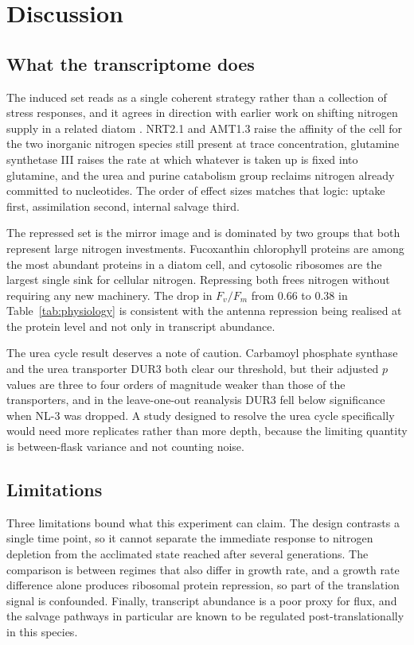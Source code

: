 \section{Discussion}
\label{sec:discussion}

\subsection{What the transcriptome does}

The induced set reads as a single coherent strategy rather than a collection of
stress responses, and it agrees in direction with earlier work on shifting
nitrogen supply in a related diatom \citep{alexander2015metabolic}. NRT2.1 and AMT1.3 raise the affinity of the cell for the two
inorganic nitrogen species still present at trace concentration, glutamine
synthetase III raises the rate at which whatever is taken up is fixed into
glutamine, and the urea and purine catabolism group reclaims nitrogen already
committed to nucleotides. The order of effect sizes matches that logic: uptake
first, assimilation second, internal salvage third.

The repressed set is the mirror image and is dominated by two groups that both
represent large nitrogen investments. Fucoxanthin chlorophyll proteins are
among the most abundant proteins in a diatom cell, and cytosolic ribosomes are
the largest single sink for cellular nitrogen. Repressing both frees nitrogen
without requiring any new machinery. The drop in
$F_v/F_m$ from 0.66 to 0.38 in Table~\ref{tab:physiology} is consistent with
the antenna repression being realised at the protein level and not only in
transcript abundance.

The urea cycle result deserves a note of caution. Carbamoyl phosphate synthase
and the urea transporter DUR3 both clear our threshold, but their adjusted
$p$ values are three to four orders of magnitude weaker than those of the
transporters, and in the leave-one-out reanalysis DUR3 fell below significance
when NL-3 was dropped. A study designed to resolve the urea cycle specifically
would need more replicates rather than more depth, because the limiting
quantity is between-flask variance and not counting noise.

\subsection{Limitations}

Three limitations bound what this experiment can claim. The design contrasts a
single time point, so it cannot separate the immediate response to nitrogen
depletion from the acclimated state reached after several generations. The
comparison is between regimes that also differ in growth rate, and a growth
rate difference alone produces ribosomal protein repression, so part of the
translation signal is confounded. Finally, transcript abundance is a poor proxy
for flux, and the salvage pathways in particular are known to be regulated
post-translationally in this species.

